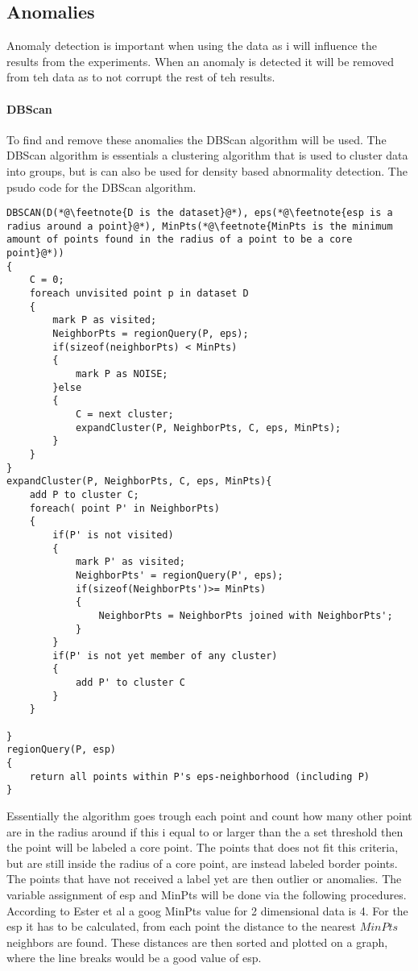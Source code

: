 \subsection{Anomalies}
Anomaly detection is important when using the data as i will influence the results from the experiments. When an anomaly is detected it will be removed from teh data as to not corrupt the rest of teh results.
\paragraph{DBScan}
To find and remove these anomalies the DBScan algorithm will be used. The DBScan algorithm is essentials a clustering algorithm that is used to cluster data into groups, but is can also be used for density based abnormality detection. The psudo code for the DBScan algorithm\cite{ester1996density}.
\begin{lstlisting}
DBSCAN(D(*@\feetnote{D is the dataset}@*), eps(*@\feetnote{esp is a radius around a point}@*), MinPts(*@\feetnote{MinPts is the minimum amount of points found in the radius of a point to be a core point}@*))
{
    C = 0;
    foreach unvisited point p in dataset D
    {
        mark P as visited;
        NeighborPts = regionQuery(P, eps);
        if(sizeof(neighborPts) < MinPts)
        {
            mark P as NOISE;
        }else
        {
            C = next cluster;
            expandCluster(P, NeighborPts, C, eps, MinPts);
        }
    }
}
expandCluster(P, NeighborPts, C, eps, MinPts){
    add P to cluster C;
    foreach( point P' in NeighborPts)
    {
        if(P' is not visited)
        {
            mark P' as visited;
            NeighborPts' = regionQuery(P', eps);
            if(sizeof(NeighborPts')>= MinPts)
            {
                NeighborPts = NeighborPts joined with NeighborPts';
            }
        }
        if(P' is not yet member of any cluster)
        {
            add P' to cluster C
        }
    }

}
regionQuery(P, esp)
{
    return all points within P's eps-neighborhood (including P)
}
\end{lstlisting}

Essentially the algorithm goes trough each point and count how many other point are in the radius around if this i equal to or larger than the a set threshold then the point will be labeled a core point. The points that does not fit this criteria, but are still inside the radius of a core point, are instead labeled border points. The points that have not received a label yet are then outlier or anomalies. The variable assignment of esp and MinPts will be done via the following procedures. According to Ester et al a goog MinPts value for 2 dimensional data is 4\cite{ester1996density}. For the esp it has to be calculated, from each point the distance to the nearest $MinPts$ neighbors are found. These distances are then sorted and plotted on a graph, where the line breaks would be a good value of esp.


